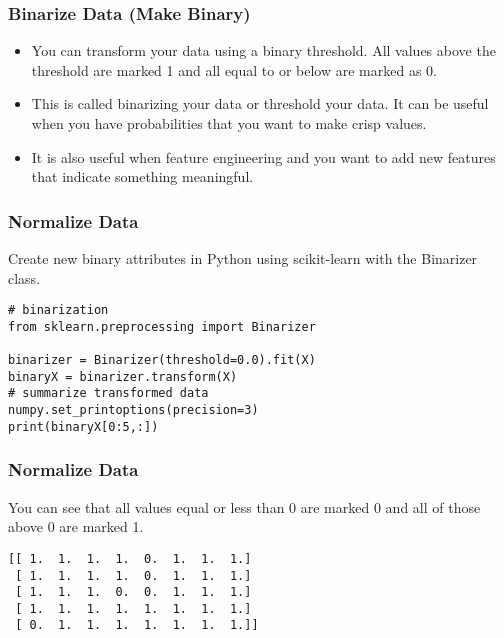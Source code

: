 \begin{frame}[fragile]\frametitle{Binarize Data (Make Binary)}

	\begin{itemize}
	\item You can transform your data using a binary threshold. All values above the threshold are marked 1 and all equal to or below are marked as 0.
	\item This is called binarizing your data or threshold your data. It can be useful when you have probabilities that you want to make crisp values. 
	\item It is also useful when feature engineering and you want to add new features that indicate something meaningful.
	\end{itemize}
	
\end{frame}

\begin{frame}[fragile]\frametitle{Normalize Data}
Create new binary attributes in Python using scikit-learn with the Binarizer class.
\begin{lstlisting}
# binarization
from sklearn.preprocessing import Binarizer

binarizer = Binarizer(threshold=0.0).fit(X)
binaryX = binarizer.transform(X)
# summarize transformed data
numpy.set_printoptions(precision=3)
print(binaryX[0:5,:])
\end{lstlisting}
\end{frame}

\begin{frame}[fragile]\frametitle{Normalize Data}
You can see that all values equal or less than 0 are marked 0 and all of those above 0 are marked 1.
\begin{lstlisting}
[[ 1.  1.  1.  1.  0.  1.  1.  1.]
 [ 1.  1.  1.  1.  0.  1.  1.  1.]
 [ 1.  1.  1.  0.  0.  1.  1.  1.]
 [ 1.  1.  1.  1.  1.  1.  1.  1.]
 [ 0.  1.  1.  1.  1.  1.  1.  1.]]
\end{lstlisting}
\end{frame}









